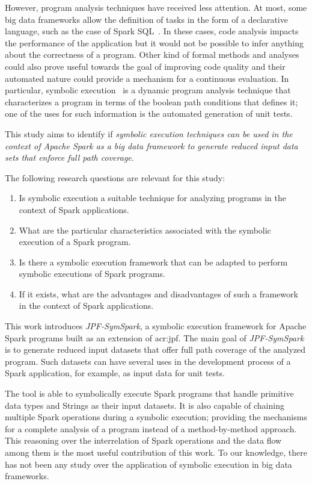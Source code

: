 However, program analysis techniques have received less attention. At most, some big data frameworks allow the definition of tasks in the form of a declarative language, such as the case of Spark SQL~\cite{Armbrust2015}. In these cases, code analysis impacts the performance of the application but it would not be possible to infer anything about the correctness of a program. Other kind of formal methods and analyses could also prove useful towards the goal of improving code quality and their automated nature could provide a mechanism for a continuous evaluation. In particular, symbolic execution~\cite{Hoare1969,King1976} is a dynamic program analysis technique that characterizes a program in terms of the boolean path conditions that defines it; one of the uses for such information is the automated generation of unit tests. 

This study aims to identify if \textit{symbolic execution techniques can be used in the context of Apache Spark as a big data framework to generate reduced input data sets that enforce full path coverage}.

The following research questions are relevant for this study:

\begin{enumerate}
	\item Is symbolic execution a suitable technique for analyzing programs in the context of Spark applications.
	\item What are the particular characteristics associated with the symbolic execution of a Spark program.
	\item Is there a symbolic execution framework that can be adapted to perform symbolic executions of Spark programs.
	\item If it exists, what are the advantages and disadvantages of such a framework in the context of Spark applications.	
\end{enumerate}

\label{sec:contributions}

This work introduces \textit{JPF-SymSpark}, a symbolic execution framework for Apache Spark programs built as an extension of \acrfull{acr:jpf}. The main goal of \textit{JPF-SymSpark} is to generate reduced input datasets that offer full path coverage of the analyzed program. Such datasets can have several uses in the development process of a Spark application, for example, as input data for unit tests.

The tool is able to symbolically execute Spark programs that handle primitive data types and Strings as their input datasets. It is also capable of chaining multiple Spark operations during a symbolic execution; providing the mechanisms for a complete analysis of a program instead of a method-by-method approach. This reasoning over the interrelation of Spark operations and the data flow among them is the most useful contribution of this work. To our knowledge, there has not been any study over the application of symbolic execution in big data frameworks.

